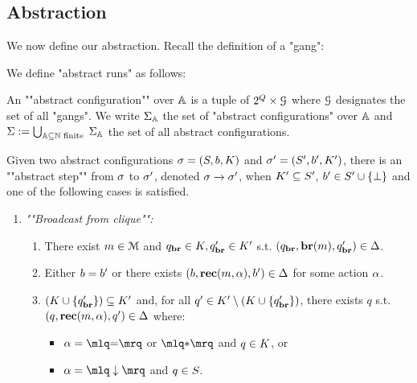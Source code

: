 \subsection{Abstraction}

We now define our abstraction. Recall the definition of a "gang":


We define "abstract runs" as follows:
 
\begin{definition}
	\label{def:abstract-configuration}
	An ""abstract configuration"" over $\mathbb{A}$ is a tuple of $2^Q \times \mathcal{G}$ where $\mathcal{G}$ designates the set of all "gangs". We write $\Sigma_{\mathbb{A}}$ the set of "abstract configurations" over $\mathbb{A}$ and $\Sigma := \bigcup_{\mathbb{A} \subseteq \mathbb{N} \text{ finite }}\Sigma_{\mathbb{A}}$ the set of all abstract configurations. 
	
	Given two abstract configurations $\aconfig = (\covset, \boss, \clique)$ and $\aconfig' = (\covset', \boss', \clique')$, there is an ""abstract step"" from $\sigma$ to $\sigma'$, denoted $\sigma \xrightarrow{} \sigma'$, when $\clique' \subseteq \covset'$, $\boss' \in \covset' \cup \set{\noboss}$ and one of the following cases is satisfied.
	\begin{enumerate}
		\item \emph{""Broadcast from clique"":}
		\begin{enumerate}[label = (\arabic*)]
			\item\label{item:broadcast_from_clique_broadcast} There exist $m \in \mathcal{M}$ and $\statebr \in \clique, \statebr' \in \clique'$ s.t. $(q_{\textbf{br}}, \textbf{br}(m), q_{\textbf{br}}') \in \Delta$. 
			
			\item\label{item:broadcast_from_clique_boss} Either $\boss = \boss'$ or there exists $(\boss, \recone{\amessage}{\anact}, \boss') \in \transitions$ for some action $\alpha$.
			
			\item\label{item:broadcast_from_clique_clique}$(\clique \cup \set{\statebr'}) \subseteq \clique'$ and, for all $q' \in \clique' \setminus (\clique \cup \set{\statebr'})$, there exists $q$ s.t. $(q, \textbf{rec}(m, \alpha), q') \in \Delta$ where:
			\begin{itemize}
				\item $\anact = \quotemarks{\eqtestact}$ or $\quotemarks{\dummyact}$ and $q \in \clique$, or
				\item $\anact= \quotemarks{\enregact}$ and $q \in S$.
			\end{itemize}
			

\end{enumerate}
\end{enumerate}
\end{definition}
